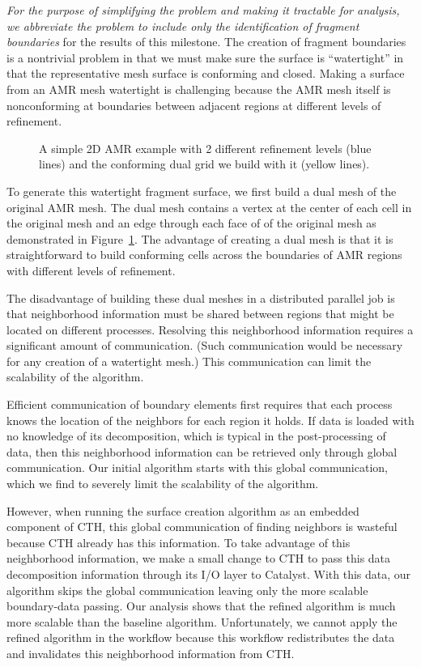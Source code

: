 \emph{For the purpose of simplifying the problem and making it tractable
  for analysis, we abbreviate the problem to include only the
  identification of fragment boundaries} for the results of this milestone.
The creation of fragment boundaries is a nontrivial problem in that we must
make sure the surface is ``watertight'' in that the representative mesh
surface is conforming and closed.  Making a surface from an AMR mesh
watertight is challenging because the AMR mesh itself is nonconforming at
boundaries between adjacent regions at different levels of refinement.

\begin{figure}[htb]
  \centering
  \caption{A simple 2D AMR example with 2 different refinement levels (blue
    lines) and the conforming dual grid we build with it (yellow lines).}
  \label{fig:AMRDual}
\end{figure}

To generate this watertight fragment surface, we first build a dual mesh of
the original AMR mesh.  The dual mesh contains a vertex at the center of
each cell in the original mesh and an edge through each face of of the
original mesh as demonstrated in Figure~\ref{fig:AMRDual}.  The advantage
of creating a dual mesh is that it is straightforward to build conforming
cells across the boundaries of AMR regions with different levels of
refinement.

The disadvantage of building these dual meshes in a distributed parallel
job is that neighborhood information must be shared between regions that
might be located on different processes.  Resolving this neighborhood
information requires a significant amount of communication.  (Such
communication would be necessary for any creation of a watertight mesh.)
This communication can limit the scalability of the algorithm.

Efficient communication of boundary elements first requires that each
process knows the location of the neighbors for each region it holds.  If
data is loaded with no knowledge of its decomposition, which is typical in
the post-processing of data, then this neighborhood information can be
retrieved only through global communication.  Our initial
 algorithm starts with this global communication, which
we find to severely limit the scalability of the algorithm.

However, when running the surface creation algorithm as an embedded \insitu
component of CTH, this global communication of finding neighbors is
wasteful because CTH already has this information.  To take advantage of
this neighborhood information, we make a small change to CTH to pass this
data decomposition information through its I/O layer to Catalyst.  With
this data, our  algorithm skips the global communication
leaving only the more scalable boundary-data passing.  Our analysis shows
that the refined algorithm is much more scalable than the baseline
algorithm.  Unfortunately, we cannot apply the refined
algorithm in the \intransit workflow because this workflow redistributes
the data and invalidates this neighborhood information from CTH.
